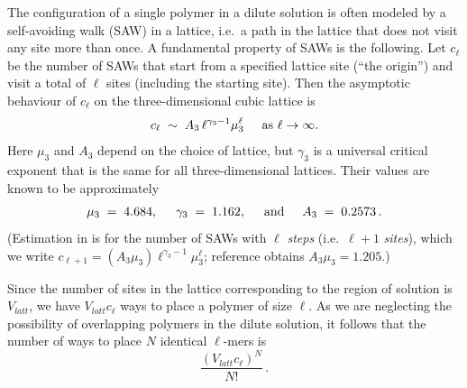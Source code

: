 \documentclass[journal=mamobx,manuscript=article]{achemso}
\begin{document}
The configuration of a single  polymer in a dilute solution is often modeled by
a self-avoiding walk (SAW) in a lattice, i.e.\  a path in the lattice that does not visit any site more than once.
A fundamental property of SAWs is the following.  
Let $c_{\ell}$ be
the number of SAWs that start from a specified lattice site (``the origin'') and visit a total of $\ell$ sites
(including the starting site).   Then the 
asymptotic behaviour of $c_{\ell}$ on the three-dimensional cubic lattice is 
\begin{equation}
    \label{eq.sawscale}
       c_{\ell}  \;\sim  \;  A_3 \, {\ell}^{\gamma_3-1}  \mu_3^{\ell}    \hspace{5mm}\hbox{as $\ell\rightarrow\infty$}.
\end{equation}
Here $\mu_3$ and $A_3$ depend on the choice of lattice, but $\gamma_3$ is a universal critical exponent
that is the same for all three-dimensional lattices.  
Their values are known to be approximately \cite{Chen2002,Madras2013}
\begin{equation}
   \label{eq.gammas}   \mu_3 \;=\;  4.684, \hspace{5mm}
        \gamma_3 \;=\;  1.162,    \hspace{5mm}\hbox{and}\hspace{5mm}
    A_3  \;=\;    0.2573  \,.  %
\end{equation}
(Estimation in \cite{Chen2002} is for the 
number of SAWs with $\ell$ \textit{steps} (i.e.\ $\ell+1$ \textit{sites}), which we write  $c_{\ell+1}=(A_3\mu_3)\ell^{\gamma_3-1}\mu_3^{\ell}$; reference \cite{Chen2002} obtains $A_3\mu_3=1.205$.)

Since the number of sites in the lattice corresponding to the region of solution is $V_{latt}$, 
we have $V_{latt}c_{\ell}$ ways to place a polymer of size ${\ell}$.  As we are neglecting the
possibility of overlapping polymers in the dilute solution, it follows that the number of ways to 
place $N$ identical $\ell$-mers is 
\begin{equation}
  \label{eq.Npoly}
   \frac{(V_{latt}c_{\ell})^N}{N!}  \,.   
\end{equation}

\smallskip
\end{document}
